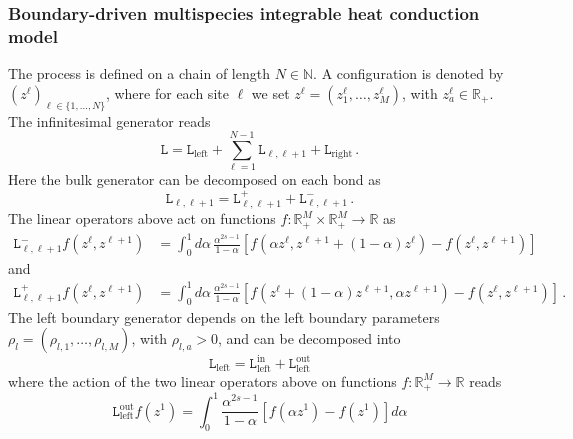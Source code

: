 \documentclass[11pt]{article}
\numberwithin{equation}{section}
\newcommand{\M}{M}
\newcommand{\N}{N}
\newcommand{\ecdL}{\mathtt{L}}
\newcommand{\heat}{z}
\begin{document}
\subsubsection{Boundary-driven multispecies integrable heat conduction model}\label{sec:heat}
The process is defined on a chain of length $\N\in\mathbb{N}$. A configuration is denoted by $(\heat^{\ell})_{\ell\in \{1,\ldots,\N\}}$, where for each site $\ell$ we set  $\heat^{\ell}=(\heat_{1}^{\ell},\ldots,\heat_{\M}^{\ell})$, with $\heat_{a}^{\ell}\in \mathbb{R}_{+}$. The infinitesimal generator reads 
\begin{equation}\label{heatGenerato}
	\ecdL=\ecdL_{\text{left}}+\sum_{\ell=1}^{\N-1}\ecdL_{\ell,\ell+1}+\ecdL_{\text{right}}\,.
\end{equation}
Here the bulk generator can be decomposed on each bond as
\begin{equation}\label{bulk-Heat}
	\ecdL_{\ell,\ell+1}=\ecdL^{+}_{\ell,\ell+1}+\ecdL^{-}_{\ell,\ell+1}\,.
\end{equation}
The linear operators above act on functions $f:\mathbb{R}_{+}^{\M}\times \mathbb{R}_{+}^{\M}\to \mathbb{R}$ as 
\begin{equation}\label{redR2sl2int4b}
	\begin{split}
		\ecdL^{-}_{\ell,\ell+1}f(\heat^{\ell},\heat^{\ell+1})&= \int_0^1d\alpha\,\frac{\alpha ^{2s-1}}{1-\alpha}\left[f(\alpha \heat^{\ell},\heat^{\ell+1}+(1-\alpha)\heat^{\ell})-f(\heat^{\ell},\heat^{\ell+1})\right]
	\end{split}
\end{equation}
and
\begin{equation}\label{redR2sl2int24b}
	\begin{split}
		\ecdL^{+}_{\ell,\ell+1}f(\heat^{\ell},\heat^{\ell+1})&= \int_0^1d\alpha\,\frac{\alpha ^{2s-1}}{1-\alpha}\left[f(\heat^{\ell}+(1-\alpha)\heat^{\ell+1},\alpha \heat^{\ell+1})-f(\heat^{\ell},\heat^{\ell+1})\right]\,.
	\end{split}
\end{equation}
The left boundary generator depends on  the left boundary parameters $\rho_{l}=(\rho_{l,1},\ldots,\rho_{l,\M})$, with $\rho_{l,a}>0$, and can be decomposed into
\begin{equation}
	\ecdL_{\text{left}}=\ecdL_{\text{left}}^{\text{in}}+\ecdL_{\text{left}}^{\text{out}}
\end{equation}
where the action of the two linear operators above  on functions $f:\mathbb{R}_{+}^{\M}\to \mathbb{R}$ reads
\begin{equation}
	\ecdL_{\text{left}}^{\text{out}}f(\heat^{1})=\int_0^1 \frac{\alpha^{2s-1}}{1-\alpha}\left[f(\alpha \heat^{1})-f(\heat^{1}) \right]d\alpha
\end{equation}
\end{document}
